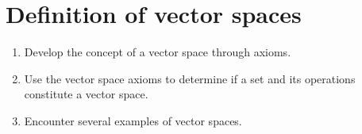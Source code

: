 \section{Definition of vector spaces}
\label{sec:definition-vector-spaces}

\begin{outcome}
  \begin{enumerate}
  \item Develop the concept of a vector space through axioms.
  \item Use the vector space axioms to determine if a set and its
    operations constitute a vector space.
  \item Encounter several examples of vector spaces.
  \end{enumerate}
\end{outcome}

